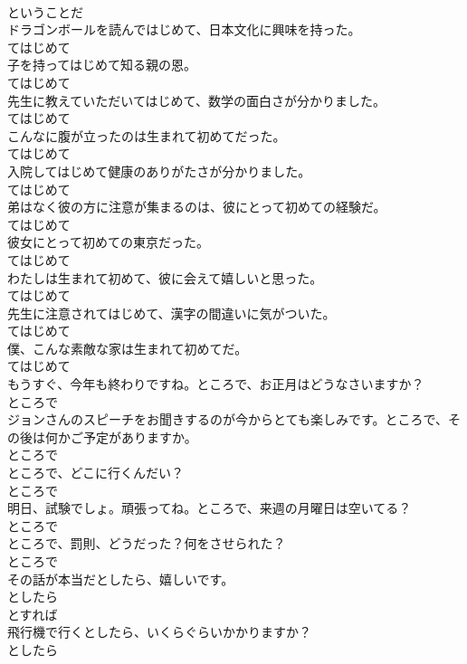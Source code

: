 \documentclass[8pt]{extreport}
\begin{document}
\begin{CJK}{UTF8}{min}
\\	ということだ
\\	ドラゴンボールを読んではじめて、日本文化に興味を持った。	
\\	てはじめて
\\	子を持ってはじめて知る親の恩。	
\\	てはじめて
\\	先生に教えていただいてはじめて、数学の面白さが分かりました。	
\\	てはじめて
\\	こんなに腹が立ったのは生まれて初めてだった。	
\\	てはじめて
\\	入院してはじめて健康のありがたさが分かりました。	
\\	てはじめて
\\	弟はなく彼の方に注意が集まるのは、彼にとって初めての経験だ。	
\\	てはじめて
\\	彼女にとって初めての東京だった。	
\\	てはじめて
\\	わたしは生まれて初めて、彼に会えて嬉しいと思った。	
\\	てはじめて
\\	先生に注意されてはじめて、漢字の間違いに気がついた。	
\\	てはじめて
\\	僕、こんな素敵な家は生まれて初めてだ。	
\\	てはじめて
\\	もうすぐ、今年も終わりですね。ところで、お正月はどうなさいますか？	
\\	ところで
\\	ジョンさんのスピーチをお聞きするのが今からとても楽しみです。ところで、その後は何かご予定がありますか。	
\\	ところで
\\	ところで、どこに行くんだい？	
\\	ところで
\\	明日、試験でしょ。頑張ってね。ところで、来週の月曜日は空いてる？	
\\	ところで
\\	ところで、罰則、どうだった？何をさせられた？	
\\	ところで
\\	その話が本当だとしたら、嬉しいです。	
\\	としたら 
\\	とすれば
\\	飛行機で行くとしたら、いくらぐらいかかりますか？	
\\	としたら 

\end{CJK}
\end{document}
